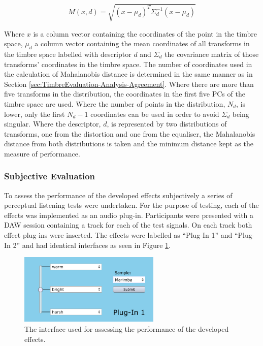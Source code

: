 			\begin{equation}
				M(x, d) = \sqrt{(x - \mu_{d})^{T}\Sigma_{d}^{-1}(x - \mu_{d})}
				\label{eq:Mahalanobis}
			\end{equation}

			Where $x$ is a column vector containing the coordinates of the point in the timbre space, $\mu_{d}$
			a column vector containing the mean coordinates of all transforms in the timbre space labelled with
			descriptor $d$ and $\Sigma_{d}$ the covariance matrix of those transforms' coordinates in the
			timbre space. The number of coordinates used in the calculation of Mahalanobis distance is
			determined in the same manner as in Section \ref{sec:TimbreEvaluation-Analysis-Agreement}. Where
			there are more than five transforms in the distribution, the coordinates in the first five PCs of
			the timbre space are used. Where the number of points in the distribution, $N_{d}$, is lower, only
			the first $N_{d} - 1$ coordinates can be used in order to avoid $\Sigma_{d}$ being singular. Where
			the descriptor, $d$, is represented by two distributions of transforms, one from the distortion and
			one from the equaliser, the Mahalanobis distance from both distributions is taken and the minimum
			distance kept as the measure of performance.
	
		\subsubsection*{Subjective Evaluation}
			To assess the performance of the developed effects subjectively a series of perceptual listening
			tests were undertaken. For the purpose of testing, each of the effects was implemented as an audio
			plug-in. Participants were presented with a DAW session containing a track for each of the test
			signals. On each track both effect plug-ins were inserted. The effects were labelled as ``Plug-In
			1'' and ``Plug-In 2'' and had identical interfaces as seen in Figure \ref{fig:TestPlugInterface}.

			\begin{figure}[h!]
				\centering
				\includegraphics[width=0.6\textwidth]{chapter7/Images/TestPlugInInterface.png}
				\caption{The interface used for assessing the performance of the developed effects.}
				\label{fig:TestPlugInterface}
			\end{figure}

